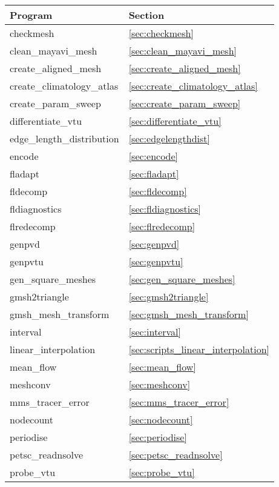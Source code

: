 \begin{table}
\begin{center}
  \begin{tabular}{| l | l |}
    \hline
	Program					& Section 				\\
    \hline
	checkmesh				& \ref{sec:checkmesh}			\\
    clean\_mayavi\_mesh       & \ref{sec:clean_mayavi_mesh} \\
	create\_aligned\_mesh 			& \ref{sec:create_aligned_mesh}	\\
	create\_climatology\_atlas		& \ref{sec:create_climatology_atlas}	\\
	create\_param\_sweep			& \ref{sec:create_param_sweep}		\\
	differentiate\_vtu          		& \ref{sec:differentiate_vtu}		\\
	edge\_length\_distribution		& \ref{sec:edgelengthdist} 		\\
	encode                  		& \ref{sec:encode} 	        	\\
	fladapt					& \ref{sec:fladapt}			\\
	fldecomp				& \ref{sec:fldecomp}			\\
	fldiagnostics				& \ref{sec:fldiagnostics}		\\
	flredecomp				& \ref{sec:flredecomp}			\\
	genpvd					& \ref{sec:genpvd} \\
	genpvtu					& \ref{sec:genpvtu}			\\
	gen\_square\_meshes			& \ref{sec:gen_square_meshes} 		\\
	gmsh2triangle				& \ref{sec:gmsh2triangle}		\\
	gmsh\_mesh\_transform			& \ref{sec:gmsh_mesh_transform}	\\
	interval				& \ref{sec:interval} 			\\
	linear\_interpolation			& \ref{sec:scripts_linear_interpolation} \\	
	mean\_flow				& \ref{sec:mean_flow}			\\
	meshconv				& \ref{sec:meshconv} \\
	mms\_tracer\_error			& \ref{sec:mms_tracer_error}		\\
	nodecount				& \ref{sec:nodecount}			\\
	periodise				& \ref{sec:periodise}			\\
	petsc\_readnsolve			& \ref{sec:petsc_readnsolve} 		\\
	probe\_vtu  				& \ref{sec:probe_vtu} 			\\

\end{tabular}
\end{center}
\end{table}
